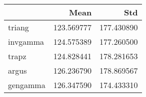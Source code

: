 \begin{tabular}{lrr}
\toprule
{} &        Mean &         Std \\
\midrule
triang   &  123.569777 &  177.430890 \\
invgamma &  124.575389 &  177.260500 \\
trapz    &  124.828441 &  178.281653 \\
argus    &  126.236790 &  178.869567 \\
gengamma &  126.347590 &  174.433310 \\
\bottomrule
\end{tabular}

